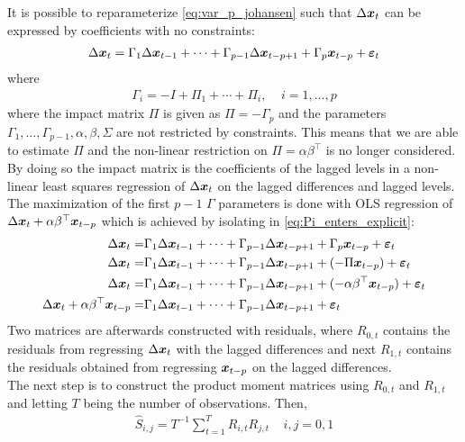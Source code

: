 \noindent It is possible to reparameterize \eqref{eq:var_p_johansen} such that $\Delta \boldsymbol{x}_t$ can be expressed by coefficients with no constraints:
\begin{align}\label{eq:Pi_enters_explicit}
    \Delta \boldsymbol{x}_t=\Gamma_1\Delta \boldsymbol{x}_{t-1}+\cdots+\Gamma_{p-1}\Delta \boldsymbol{x}_{t-p+1}+\Gamma_{p}\boldsymbol{x}_{t-p}+\boldsymbol{\varepsilon}_t
\end{align}
where 
\begin{align*}
    \Gamma_i=-I+\Pi_1+\cdots+\Pi_i,\;\;\;\; i=1,\ldots,p
\end{align*}
where the impact matrix $\Pi$ is given as $\Pi=-\Gamma_p$ and the parameters $\Gamma_1,\ldots,\Gamma_{p-1},\alpha,\beta,\Sigma$ are not restricted by constraints. This means that we are able to estimate $\Pi$ and the non-linear restriction on $\Pi=\alpha\beta^\top$ is no longer considered. By doing so the impact matrix is the coefficients of the lagged levels in a non-linear least squares regression of $\Delta \boldsymbol{x}_t$ on the lagged differences and lagged levels.\\
\noindent The maximization of the first $p-1$ $\Gamma$ parameters is done with OLS regression of $\Delta \boldsymbol{x}_t+\alpha\beta^\top \boldsymbol{x}_{t-p}$ which is achieved by isolating in \eqref{eq:Pi_enters_explicit}:
\begin{align*}
    \Delta \boldsymbol{x}_t=&\Gamma_1\Delta \boldsymbol{x}_{t-1}+\cdots+\Gamma_{p-1}\Delta \boldsymbol{x}_{t-p+1}+\Gamma_{p}\boldsymbol{x}_{t-p}+\boldsymbol{\varepsilon}_t \\
    \Delta \boldsymbol{x}_t=&\Gamma_1\Delta \boldsymbol{x}_{t-1}+\cdots+ \Gamma_{p-1}\Delta \boldsymbol{x}_{t-p+1}+(-\Pi \boldsymbol{x}_{t-p})+\boldsymbol{\varepsilon}_t  \\
    \Delta \boldsymbol{x}_t=&\Gamma_1\Delta \boldsymbol{x}_{t-1}+\cdots+ \Gamma_{p-1}\Delta \boldsymbol{x}_{t-p+1}+(-\alpha\beta^\top \boldsymbol{x}_{t-p})+\boldsymbol{\varepsilon}_t \\
    \Delta \boldsymbol{x}_t +\alpha\beta^\top \boldsymbol{x}_{t-p}=&\Gamma_1\Delta \boldsymbol{x}_{t-1}+\cdots+\Gamma_{p-1}\Delta \boldsymbol{x}_{t-p+1}+\boldsymbol{\varepsilon}_t
\end{align*}
Two matrices are afterwards constructed with residuals, where $R_{0,t}$ contains the residuals from regressing $\Delta \boldsymbol{x}_t$ with the lagged differences and next $R_{1,t}$ contains the residuals obtained from regressing $\boldsymbol{x}_{t-p}$ on the lagged differences.\\
The next step is to construct the product moment matrices using $R_{0,t}$ and $R_{1,t}$ and letting $T$ being the number of observations. Then,
\begin{align}\label{eq:prod_mom_mat}
\hat{S}_{i,j}=T^{-1}\sum_{t=1}^
T R_{i,t}R_{j,t}\;\;\;\; i,j=0,1
\end{align}
